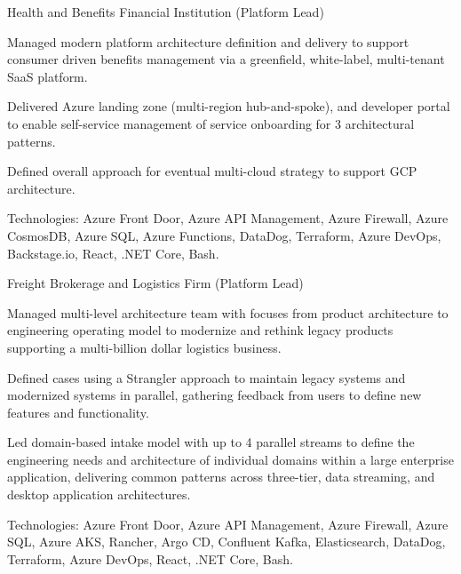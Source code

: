\begin{cventries}
  \cventry
    {Health and Benefits Financial Institution (Platform Lead)} %
    {} %
    {} %
    {} %
    {
      \begin{cvitems} %
        \item {Managed modern platform architecture definition and delivery to support consumer driven benefits management via a greenfield, white-label, multi-tenant SaaS platform.}
        \item {Delivered Azure landing zone (multi-region hub-and-spoke), and developer portal to enable self-service management of service onboarding for 3 architectural patterns.}
        \item {Defined overall approach for eventual multi-cloud strategy to support GCP architecture.}
        \item {Technologies: Azure Front Door, Azure API Management, Azure Firewall, Azure CosmosDB, Azure SQL, Azure Functions, DataDog, Terraform, Azure DevOps, Backstage.io, React, .NET Core, Bash.}
      \end{cvitems}
    }

  \cventry
    {Freight Brokerage and Logistics Firm (Platform Lead)} %
    {} %
    {} %
    {} %
    {
      \begin{cvitems} %
        \item {Managed multi-level architecture team with focuses from product architecture to engineering operating model to modernize and rethink legacy products supporting a multi-billion dollar logistics business.}
        \item {Defined cases using a Strangler approach to maintain legacy systems and modernized systems in parallel, gathering feedback from users to define new features and functionality.}
        \item {Led domain-based intake model with up to 4 parallel streams to define the engineering needs and architecture of individual domains within a large enterprise application, delivering common patterns across three-tier, data streaming, and desktop application architectures.}
        \item {Technologies: Azure Front Door, Azure API Management, Azure Firewall, Azure SQL, Azure AKS, Rancher, Argo CD, Confluent Kafka, Elasticsearch, DataDog, Terraform, Azure DevOps, React, .NET Core, Bash.}
      \end{cvitems}
    }


\end{cventries}
